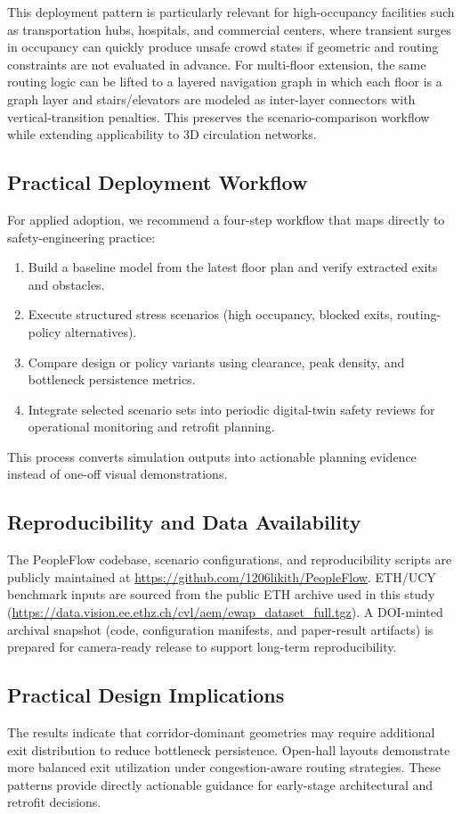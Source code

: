 \documentclass[journal]{IEEEtran}
\begin{document}
This deployment pattern is particularly relevant for high-occupancy facilities such as transportation hubs, hospitals, and commercial centers, where transient surges in occupancy can quickly produce unsafe crowd states if geometric and routing constraints are not evaluated in advance.
For multi-floor extension, the same routing logic can be lifted to a layered navigation graph in which each floor is a graph layer and stairs/elevators are modeled as inter-layer connectors with vertical-transition penalties. This preserves the scenario-comparison workflow while extending applicability to 3D circulation networks.

\subsection{Practical Deployment Workflow}
For applied adoption, we recommend a four-step workflow that maps directly to safety-engineering practice:
\begin{enumerate}
    \item Build a baseline model from the latest floor plan and verify extracted exits and obstacles.
    \item Execute structured stress scenarios (high occupancy, blocked exits, routing-policy alternatives).
    \item Compare design or policy variants using clearance, peak density, and bottleneck persistence metrics.
    \item Integrate selected scenario sets into periodic digital-twin safety reviews for operational monitoring and retrofit planning.
\end{enumerate}
This process converts simulation outputs into actionable planning evidence instead of one-off visual demonstrations.

\subsection{Reproducibility and Data Availability}
The PeopleFlow codebase, scenario configurations, and reproducibility scripts are publicly maintained at \url{https://github.com/1206likith/PeopleFlow}. ETH/UCY benchmark inputs are sourced from the public ETH archive used in this study (\url{https://data.vision.ee.ethz.ch/cvl/aem/ewap_dataset_full.tgz}). A DOI-minted archival snapshot (code, configuration manifests, and paper-result artifacts) is prepared for camera-ready release to support long-term reproducibility.

\subsection{Practical Design Implications}
The results indicate that corridor-dominant geometries may require additional exit distribution to reduce bottleneck persistence. Open-hall layouts demonstrate more balanced exit utilization under congestion-aware routing strategies. These patterns provide directly actionable guidance for early-stage architectural and retrofit decisions.
\end{document}
